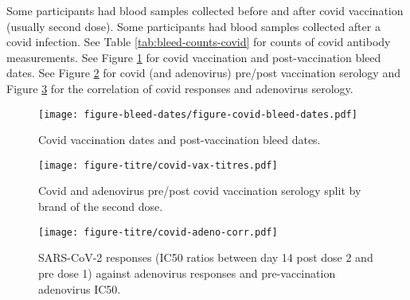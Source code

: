 \documentclass[12pt]{article}
\begin{document}
Some participants had blood samples collected before and after covid vaccination (usually second dose). Some participants had blood samples collected after a covid infection.
See Table \ref{tab:bleed-counts-covid} for counts of covid antibody measurements.
See Figure \ref{fig:covid-vax-bleed-dates} for covid vaccination and post-vaccination bleed dates.
See Figure \ref{fig:covid-vax-titres} for covid (and adenovirus) pre/post vaccination serology and Figure \ref{fig:covid-adeno-corr} for the correlation of covid responses and adenovirus serology.



\begin{figure}
	\texttt{[image: figure-bleed-dates/figure-covid-bleed-dates.pdf]}
	\caption{Covid vaccination dates and post-vaccination bleed dates.}
	\label{fig:covid-vax-bleed-dates}
\end{figure}

\begin{figure}
	\texttt{[image: figure-titre/covid-vax-titres.pdf]}
	\caption{Covid and adenovirus pre/post covid vaccination serology split by brand of the second dose.}
	\label{fig:covid-vax-titres}
\end{figure}

\begin{figure}
	\texttt{[image: figure-titre/covid-adeno-corr.pdf]}
	\caption{SARS-CoV-2 responses (IC50 ratios between day 14 post dose 2 and pre dose 1) against adenovirus responses and pre-vaccination adenovirus IC50.}
	\label{fig:covid-adeno-corr}
\end{figure}
\end{document}
